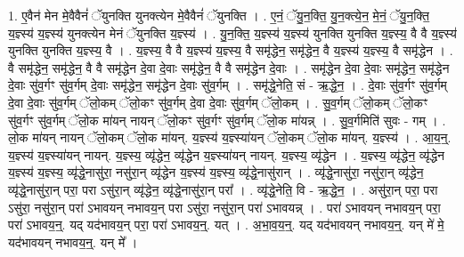 \documentclass[17pt]{extarticle}
\begin{document}
1. ए॒वैन॑ मेन मे॒वैवैनं॑ ॅयुनक्ति युनक्त्येन मे॒वैवैनं॑ ॅयुनक्ति । . ए॒नं॒ ॅयु॒न॒क्ति॒ यु॒न॒क्त्ये॒न॒ मे॒नं॒ ॅयु॒न॒क्ति॒ य॒ज्ञ्स्य॑ य॒ज्ञ्स्य॑ युनक्त्येन मेनं ॅयुनक्ति य॒ज्ञ्स्य॑ । . यु॒न॒क्ति॒ य॒ज्ञ्स्य॑ य॒ज्ञ्स्य॑ युनक्ति युनक्ति य॒ज्ञ्स्य॒ वै वै य॒ज्ञ्स्य॑ युनक्ति युनक्ति य॒ज्ञ्स्य॒ वै । . य॒ज्ञ्स्य॒ वै वै य॒ज्ञ्स्य॑ य॒ज्ञ्स्य॒ वै समृ॑द्धेन॒ समृ॑द्धेन॒ वै य॒ज्ञ्स्य॑ य॒ज्ञ्स्य॒ वै समृ॑द्धेन । . वै समृ॑द्धेन॒ समृ॑द्धेन॒ वै वै समृ॑द्धेन दे॒वा दे॒वाः समृ॑द्धेन॒ वै वै समृ॑द्धेन दे॒वाः । . समृ॑द्धेन दे॒वा दे॒वाः समृ॑द्धेन॒ समृ॑द्धेन दे॒वाः सु॑व॒र्गꣳ सु॑व॒र्गम् दे॒वाः समृ॑द्धेन॒ समृ॑द्धेन दे॒वाः सु॑व॒र्गम् । . समृ॑द्धे॒नेति॒ सं - ऋ॒द्धे॒न॒ । . दे॒वाः सु॑व॒र्गꣳ सु॑व॒र्गम् दे॒वा दे॒वाः सु॑व॒र्गम् ॅलो॒कम् ॅलो॒कꣳ सु॑व॒र्गम् दे॒वा दे॒वाः सु॑व॒र्गम् ॅलो॒कम् । . सु॒व॒र्गम् ॅलो॒कम् ॅलो॒कꣳ सु॑व॒र्गꣳ सु॑व॒र्गम् ॅलो॒क मा॑यन् नायन् ॅलो॒कꣳ सु॑व॒र्गꣳ सु॑व॒र्गम् ॅलो॒क मा॑यन्न् । . सु॒व॒र्गमिति॑ सुवः - गम् । . लो॒क मा॑यन् नायन् ॅलो॒कम् ॅलो॒क मा॑यन्. य॒ज्ञ्स्य॑ य॒ज्ञ्स्या॑यन् ॅलो॒कम् ॅलो॒क मा॑यन्. य॒ज्ञ्स्य॑ । . आ॒य॒न्॒. य॒ज्ञ्स्य॑ य॒ज्ञ्स्या॑यन् नायन्. य॒ज्ञ्स्य॒ व्यृ॑द्धेन॒ व्यृ॑द्धेन य॒ज्ञ्स्या॑यन् नायन्. य॒ज्ञ्स्य॒ व्यृ॑द्धेन । . य॒ज्ञ्स्य॒ व्यृ॑द्धेन॒ व्यृ॑द्धेन य॒ज्ञ्स्य॑ य॒ज्ञ्स्य॒ व्यृ॑द्धे॒नासु॑रा॒ नसु॑रा॒न् व्यृ॑द्धेन य॒ज्ञ्स्य॑ य॒ज्ञ्स्य॒ व्यृ॑द्धे॒नासु॑रान् । . व्यृ॑द्धे॒नासु॑रा॒ नसु॑रा॒न् व्यृ॑द्धेन॒ व्यृ॑द्धे॒नासु॑रा॒न् परा॒ परा ऽसु॑रा॒न् व्यृ॑द्धेन॒ व्यृ॑द्धे॒नासु॑रा॒न् परा᳚ । . व्यृ॑द्धे॒नेति॒ वि - ऋ॒द्धे॒न॒ । . असु॑रा॒न् परा॒ परा ऽसु॑रा॒ नसु॑रा॒न् परा॑ ऽभावयन् नभावय॒न् परा ऽसु॑रा॒ नसु॑रा॒न् परा॑ ऽभावयन्न् । . परा॑ ऽभावयन् नभावय॒न् परा॒ परा॑ ऽभावय॒न्॒. यद् यद॑भावय॒न् परा॒ परा॑ ऽभावय॒न्॒. यत् । . अ॒भा॒व॒य॒न्॒. यद् यद॑भावयन् नभावय॒न्॒. यन् मे॑ मे॒ यद॑भावयन् नभावय॒न्॒. यन् मे᳚ । \newline
\end{document}
